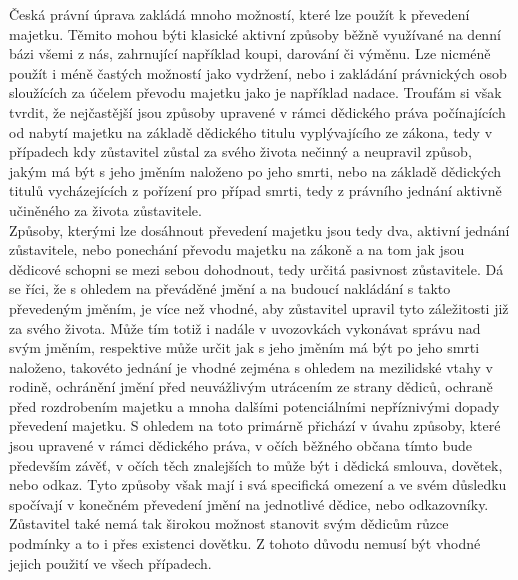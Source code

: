 \documentclass{article}
\begin{document}
Česká právní úprava zakládá mnoho možností, které lze použít k převedení majetku. Těmito mohou býti klasické aktivní způsoby běžně využívané na denní bázi všemi z nás, zahrnující například koupi, darování či výměnu. Lze nicméně použít i méně častých možností jako vydržení, nebo i zakládání právnických osob sloužících za účelem převodu majetku jako je například nadace. Troufám si však tvrdit, že nejčastější jsou způsoby upravené v rámci dědického práva počínajících od nabytí majetku na základě dědického titulu vyplývajícího ze zákona, tedy v případech kdy zůstavitel zůstal za svého života nečinný a neupravil způsob, jakým má být s jeho jměním naloženo po jeho smrti, nebo na základě dědických titulů vycházejících z pořízení pro případ smrti, tedy z právního jednání aktivně učiněného za života zůstavitele. \\

Způsoby, kterými lze dosáhnout převedení majetku jsou tedy dva, aktivní jednání zůstavitele, nebo ponechání převodu majetku na zákoně a na tom jak jsou dědicové schopni se mezi sebou dohodnout, tedy určitá pasivnost zůstavitele. Dá se říci, že s ohledem na převáděné jmění a na budoucí nakládání s takto převedeným jměním, je více než vhodné, aby zůstavitel upravil tyto záležitosti již za svého života. Může tím totiž i nadále v uvozovkách vykonávat správu nad svým jměním, respektive může určit jak s jeho jměním má být po jeho smrti naloženo, takovéto jednání je vhodné zejména s ohledem na mezilidské vtahy v rodině, ochránění jmění před neuvážlivým utrácením ze strany dědiců, ochraně před rozdrobením majetku a mnoha dalšími potenciálními nepříznivými dopady převedení majetku. S ohledem na toto primárně přichází v úvahu způsoby, které jsou upravené v rámci dědického práva, v očích běžného občana tímto bude především závěť, v očích těch znalejších to může být i dědická smlouva, dovětek, nebo odkaz. Tyto způsoby však mají i svá specifická omezení a ve svém důsledku spočívají v konečném převedení jmění na jednotlivé dědice, nebo odkazovníky. Zůstavitel také nemá tak širokou možnost stanovit svým dědicům růzce podmínky a to i přes existenci dovětku. Z tohoto důvodu nemusí být vhodné jejich použití ve všech případech. \\


\newpage
\thispagestyle{smallertextinheader}
\end{document}
